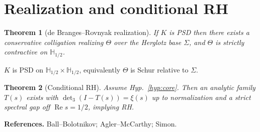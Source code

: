 \documentclass[11pt]{article}
\newcommand{\ReS}{\operatorname{Re}}
\newcommand{\Si}{\Sigma}
\newcommand{\Th}{\Theta}
\newcommand{\detm}[1]{\det\nolimits_{#1}}
\theoremstyle{plain}
\newtheorem{theorem}{Theorem}
\theoremstyle{definition}
\theoremstyle{remark}
\begin{document}
\section{Realization and conditional RH}
\begin{theorem}[de Branges--Rovnyak realization]
If $K$ is PSD then there exists a conservative colligation realizing $\Th$ over the Herglotz base $\Si$, and $\Th$ is strictly contractive on $\mathbb{H}_{1/2}$.
\end{theorem}

\begin{hypothesis}\label{hyp:core}
$K$ is PSD on $\mathbb{H}_{1/2}\times\mathbb{H}_{1/2}$, equivalently $\Th$ is Schur relative to $\Si$.
\end{hypothesis}

\begin{theorem}[Conditional RH]
Assume Hyp.~\ref{hyp:core}. Then an analytic family $T(s)$ exists with $\detm{3}(I-T(s))=\xi(s)$ up to normalization and a strict spectral gap off $\ReS s=1/2$, implying RH.
\end{theorem}

\bigskip
\noindent\textbf{References.} Ball--Bolotnikov; Agler--McCarthy; Simon.
\end{document}
